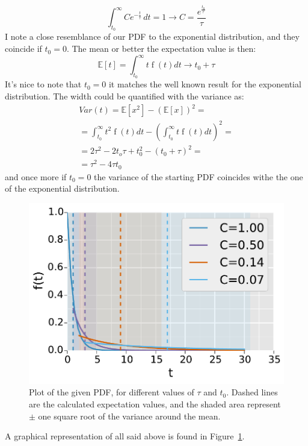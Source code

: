 \documentclass[twocolumn,10]{article}
\begin{document}
	\begin{equation}
		\int_{t_{{0}}}^{\infty} C e^{- \frac{t}{\tau}}\, dt = 1 \longrightarrow C =  \frac{
		e^{
		\frac{t_0}{\tau}
		}}
		{\tau}
	\end{equation}
	I note a close resemblance of our PDF to the exponential distribution, and they coincide if $t_0 = 0$. 
	The mean or better the expectation  value is then:
	\begin{equation}
	\mathbb{E} [t] = \int_{t_0}^{\infty} t \operatorname{f}{(t) d t } \longrightarrow  t_0 + \tau
	\end{equation}
	It's nice to note that $t_0 = 0$ it matches the well known result for the exponential distribution.
	The width could be quantified with the variance as:
	\begin{multline}
		Var(t) = \mathbb{E}[x^2] - (\mathbb{E}[x])^2 = \\
		= 
		\int_{t_0}^{\infty} t^2 \operatorname{f}{(t) d t } 
		-(\int_{t_0}^{\infty} t \operatorname{f}{(t) d t })^2 = \\
		= 2 \tau ^ 2 - 2 t_o \tau +t_0 ^2  - ( t_0 + \tau ) ^ 2 = \\
		= \tau ^ 2 - 4 \tau t_0 
	\end{multline}
	and once more if $t_0 = 0 $ the variance of the starting PDF coincides withe the one of the exponential distribution. 
	\begin{figure}[htb]
		\begin{center}
			\includegraphics[width= 0.4 \textwidth]{fig/graph.pdf}
		\end{center}
		\caption{Plot of the given PDF, for different values of $ \tau $ and $t_0 $. Dashed lines are the calculated expectation values, and the shaded area represent $\pm$ one square root of the variance around the mean.}
		\label{fig:pdf}
	\end{figure}
	A graphical representation of all said above is found in Figure~\ref{fig:pdf}.
\end{document}
